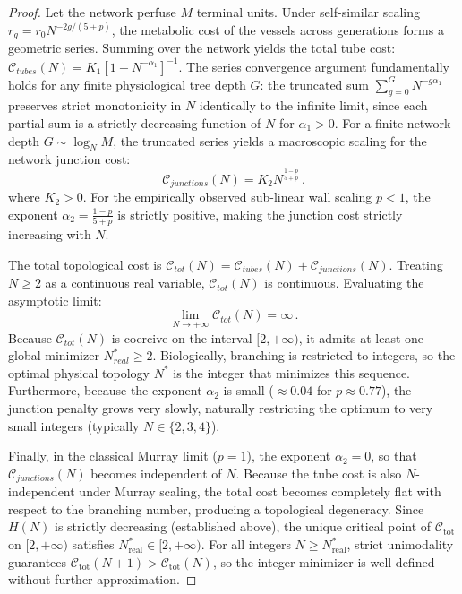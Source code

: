 \documentclass[11pt,a4paper]{article}
\theoremstyle{remark}
\begin{document}
\begin{proof}
Let the network perfuse $M$ terminal units. Under self-similar scaling $r_g =
r_0 N^{-2g/(5+p)}$, the metabolic cost of the vessels across generations forms a
geometric series. Summing over the network yields the total tube cost:
$\mathcal{C}_{tubes}(N) = K_1 \left[ 1 - N^{-\alpha_1} \right]^{-1}$. The series
convergence argument fundamentally holds for any finite physiological tree depth
$G$: the truncated sum $\sum_{g=0}^{G} N^{-g\alpha_1}$ preserves strict
monotonicity in $N$ identically to the infinite limit, since each partial sum is
a strictly decreasing function of $N$ for $\alpha_1 > 0$. For a finite network
depth $G \sim \log_N M$, the truncated series yields a macroscopic scaling for
the network junction cost:
\[ \mathcal{C}_{junctions}(N) = K_2 N^{\frac{1-p}{5+p}} \,. \]
where $K_2 > 0$. For the empirically observed sub-linear wall scaling $p < 1$,
the exponent $\alpha_2 = \frac{1-p}{5+p}$ is strictly positive, making the
junction cost strictly increasing with $N$.

The total topological cost is $\mathcal{C}_{tot}(N) = \mathcal{C}_{tubes}(N) +
\mathcal{C}_{junctions}(N)$. Treating $N \ge 2$ as a continuous real variable,
$\mathcal{C}_{tot}(N)$ is continuous. Evaluating the asymptotic limit:
\[ \lim_{N \to +\infty} \mathcal{C}_{tot}(N) = \infty \,. \]
Because $\mathcal{C}_{tot}(N)$ is coercive on the interval $[2, +\infty)$, it
admits at least one global minimizer $N_{real}^* \ge 2$. Biologically, branching
is restricted to integers, so the optimal physical topology $N^*$ is the integer
that minimizes this sequence. Furthermore, because the exponent $\alpha_2$ is
small ($\approx 0.04$ for $p \approx 0.77$), the junction penalty grows very
slowly, naturally restricting the optimum to very small integers (typically $N
\in \{2, 3, 4\}$).

Finally, in the classical Murray limit ($p=1$), the exponent $\alpha_2 = 0$, so
that $\mathcal{C}_{junctions}(N)$ becomes independent of $N$. Because the tube
cost is also $N$-independent under Murray scaling, the total cost becomes
completely flat with respect to the branching number, producing a topological
degeneracy.
Since $H(N)$ is strictly decreasing (established above), the unique
critical point of $\mathcal{C}_{\mathrm{tot}}$ on $[2,+\infty)$
satisfies $N^*_{\mathrm{real}} \in [2,+\infty)$. For all integers
$N \geq N^*_{\mathrm{real}}$, strict unimodality guarantees
$\mathcal{C}_{\mathrm{tot}}(N+1) > \mathcal{C}_{\mathrm{tot}}(N)$,
so the integer minimizer is well-defined without further approximation.
\end{proof}
\end{document}
